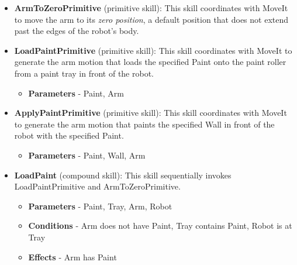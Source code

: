 \begin{itemize}
    \item {\bf ArmToZeroPrimitive} (primitive skill): This skill coordinates with MoveIt to move the arm to its {\it zero position}, a default position that does not extend past the edges of the robot's body.
    \item {\bf LoadPaintPrimitive} (primitive skill): This skill coordinates with MoveIt to generate the arm motion that loads the specified Paint onto the paint roller from a paint tray in front of the robot.
    \begin{itemize}
        \item {\bf Parameters} - Paint, Arm
    \end{itemize}
    
    \item {\bf ApplyPaintPrimitive} (primitive skill): This skill coordinates with MoveIt to generate the arm motion that paints the specified Wall in front of the robot with the specified Paint.
    \begin{itemize}
        \item {\bf Parameters} - Paint, Wall, Arm
    \end{itemize}
    
    \item {\bf LoadPaint} (compound skill): This skill sequentially invokes LoadPaintPrimitive and ArmToZeroPrimitive.
    \begin{itemize}
        \item {\bf Parameters} - Paint, Tray, Arm, Robot
        \item {\bf Conditions} - Arm does not have Paint, Tray contains Paint, Robot is at Tray
        \item {\bf Effects} - Arm has Paint
    \end{itemize}
    

\end{itemize}
